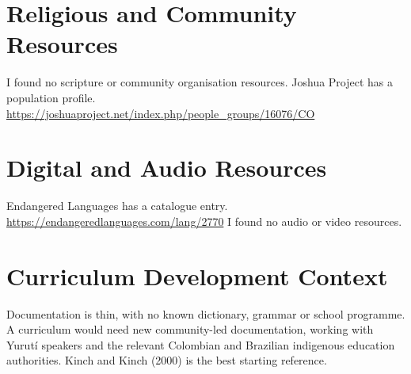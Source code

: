 \documentclass[12pt]{article}
\begin{document}
\section{Religious and Community Resources}
I found no scripture or community organisation resources. Joshua Project has a population profile. \url{https://joshuaproject.net/index.php/people_groups/16076/CO}

\section{Digital and Audio Resources}
Endangered Languages has a catalogue entry. \url{https://endangeredlanguages.com/lang/2770}
I found no audio or video resources.

\section{Curriculum Development Context}
Documentation is thin, with no known dictionary, grammar or school programme. A curriculum would need new community-led documentation, working with Yurut\'i speakers and the relevant Colombian and Brazilian indigenous education authorities. Kinch and Kinch (2000) is the best starting reference.
\end{document}
